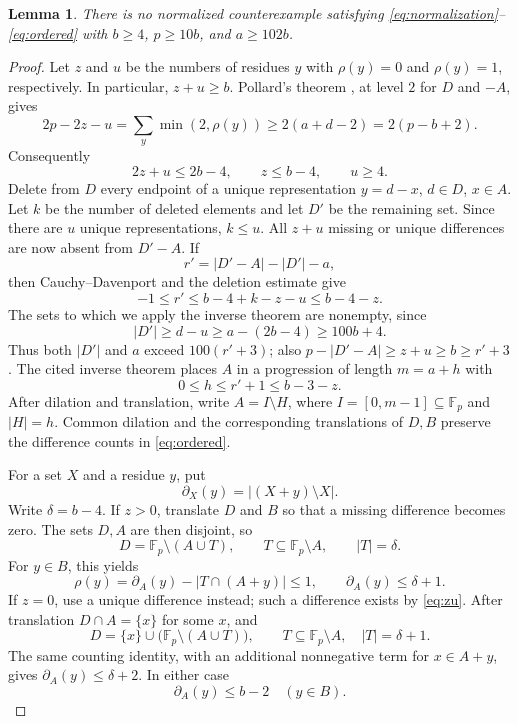 \documentclass[11pt]{article}
\newtheorem{lemma}[theorem]{Lemma}
\theoremstyle{remark}
\newcommand{\F}{\mathbb F}
\begin{document}
\begin{lemma}\label{lem:unbalanced}
There is no normalized counterexample satisfying \eqref{eq:normalization}--\eqref{eq:ordered} with $b\ge4$, $p\ge10b$, and $a\ge102b$.
\end{lemma}
\begin{proof}
Let $z$ and $u$ be the numbers of residues $y$ with $\rho(y)=0$ and $\rho(y)=1$, respectively. In particular, $z+u\ge b$. Pollard's theorem \cite{Pollard}, at level $2$ for $D$ and $-A$, gives
\[
 2p-2z-u=\sum_y\min(2,\rho(y))
 \ge2(a+d-2)=2(p-b+2).
\]
Consequently
\begin{equation}\label{eq:zu}
 2z+u\le2b-4,\qquad z\le b-4,\qquad u\ge4.
\end{equation}
Delete from $D$ every endpoint of a unique representation $y=d-x$, $d\in D$, $x\in A$. Let $k$ be the number of deleted elements and let $D'$ be the remaining set. Since there are $u$ unique representations, $k\le u$. All $z+u$ missing or unique differences are now absent from $D'-A$. If
\[
 r'=|D'-A|-|D'|-a,
\]
then Cauchy--Davenport and the deletion estimate give
\begin{equation}\label{eq:excess}
 -1\le r'\le b-4+k-z-u\le b-4-z.
\end{equation}
The sets to which we apply the inverse theorem are nonempty, since
\[
 |D'|\ge d-u\ge a-(2b-4)\ge100b+4.
\]
Thus both $|D'|$ and $a$ exceed $100(r'+3)$; also $p-|D'-A|\ge z+u\ge b\ge r'+3$. The cited inverse theorem places $A$ in a progression of length $m=a+h$ with
\begin{equation}\label{eq:holes}
 0\le h\le r'+1\le b-3-z.
\end{equation}
After dilation and translation, write $A=I\setminus H$, where $I=[0,m-1]\subseteq\F_p$ and $|H|=h$. Common dilation and the corresponding translations of $D,B$ preserve the difference counts in \eqref{eq:ordered}.

For a set $X$ and a residue $y$, put
\[
 \partial_X(y)=|(X+y)\setminus X|.
\]
Write $\delta=b-4$. If $z>0$, translate $D$ and $B$ so that a missing difference becomes zero. The sets $D,A$ are then disjoint, so
\[
 D=\F_p\setminus(A\cup T),\qquad T\subseteq\F_p\setminus A,
 \qquad |T|=\delta.
\]
For $y\in B$, this yields
\[
 \rho(y)=\partial_A(y)-|T\cap(A+y)|\le1,
 \qquad \partial_A(y)\le\delta+1.
\]
If $z=0$, use a unique difference instead; such a difference exists by \eqref{eq:zu}. After translation $D\cap A=\{x\}$ for some $x$, and
\[
 D=\{x\}\cup\bigl(\F_p\setminus(A\cup T)\bigr),
 \qquad T\subseteq\F_p\setminus A,\quad |T|=\delta+1.
\]
The same counting identity, with an additional nonnegative term for $x\in A+y$, gives $\partial_A(y)\le\delta+2$. In either case
\begin{equation}\label{eq:boundary}
 \partial_A(y)\le b-2\quad(y\in B).
\end{equation}


\end{proof}
\end{document}
